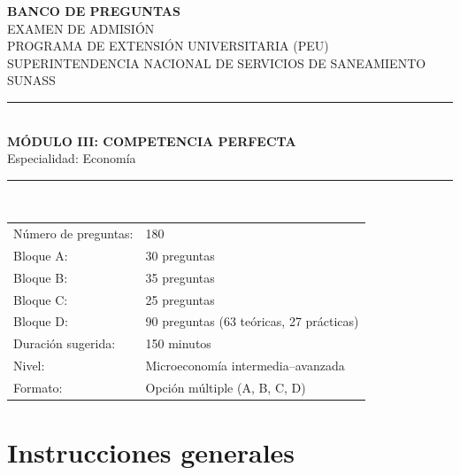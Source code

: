 \documentclass[11pt,a4paper]{article}
\begin{document}
\begin{titlepage}
\thispagestyle{empty}
\centering
\backboneportadaheader

{\Large\bfseries BANCO DE PREGUNTAS}\\[0.35cm]
{\large EXAMEN DE ADMISIÓN}\\[0.15cm]
{\large PROGRAMA DE EXTENSIÓN UNIVERSITARIA (PEU)}\\[0.15cm]
{\large SUPERINTENDENCIA NACIONAL DE SERVICIOS DE SANEAMIENTO}\\[0.05cm]
{\large SUNASS}\\[1.0cm]

\rule{\linewidth}{0.9pt}\\[0.55cm]
{\LARGE\bfseries MÓDULO III: COMPETENCIA PERFECTA}\\[0.35cm]
{\large Especialidad: Economía}\\[0.55cm]
\rule{\linewidth}{0.9pt}\\[1.0cm]

\begin{tabular}{ll}
\toprule
Número de preguntas: & 180 \\
Bloque A: & 30 preguntas \\
Bloque B: & 35 preguntas \\
Bloque C: & 25 preguntas \\
Bloque D: & 90 preguntas (63 teóricas, 27 prácticas) \\
Duración sugerida: & 150 minutos \\
Nivel: & Microeconomía intermedia--avanzada \\
Formato: & Opción múltiple (A, B, C, D) \\
\bottomrule
\end{tabular}

\vfill
\backboneportadafooter
\end{titlepage}

\section*{Instrucciones generales}
\end{document}
